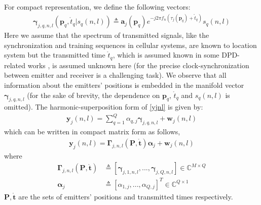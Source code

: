 \documentclass[review]{elsarticle}
\begin{document}
For compact representation, we define the following vectors:
\begin{align}\label{gamma}
    \boldsymbol{\gamma}_{j,q,n,l}(\boldsymbol{p}_q,\mathring{t}_q\vert s_q(n,l))\triangleq\boldsymbol{a}_j(\boldsymbol{p}_q)e^{-j2\pi f_n(\tau_j(\boldsymbol{p}_q)+\mathring{t}_q)}s_q(n,l)
\end{align}
Here we assume that the spectrum of transmitted signals, like the synchronization and training sequences in cellular systems, are known to location system but the transmitted time $\mathring{t}_q$, which is assumed known in some DPD-related works \cite{DPD2005,2006Efficient}, is assumed unknown here (for the precise clock-synchronization between emitter and receiver is a challenging task). We observe that all information about the emitters' positions is embedded in the manifold vector $\boldsymbol{\gamma}_{j,q,n,l}$ (for the sake of brevity, the dependence on $\boldsymbol{p}_q$, $\mathring{t}_q$ and $s_q(n,l)$ is omitted). The harmonic-superposition form of \eqref{yjnl} is given by:
\begin{align}\label{yjnl2}
    \boldsymbol{y}_j(n,l)=\sum_{q=1}^Q\alpha_{q,j}\boldsymbol{\gamma}_{j,q,n,l}+\boldsymbol{w}_j(n,l)
\end{align}
which can be written in compact matrix form as follows,
\begin{align}
    \boldsymbol{y}_j(n,l)=\boldsymbol{\Gamma}_{j,n,l}(\boldsymbol{P},\mathring{\boldsymbol{t}})\boldsymbol{\alpha}_j+\boldsymbol{w}_j(n,l)
\end{align}
where  
\begin{align}\label{Gammajnl}
    \boldsymbol{\Gamma}_{j,n,l}(\boldsymbol{P},\mathring{\boldsymbol{t}})&\triangleq[\boldsymbol{\gamma}_{j,1,n,l},...,\boldsymbol{\gamma}_{j,Q,n,l}]\in \mathbb{C}^{M\times Q}\\ \nonumber
    \boldsymbol{\alpha}_j&\triangleq[\alpha_{1,j},...,\alpha_{Q,j}]^T\in \mathbb{C}^{Q\times 1} 
\end{align}
$\boldsymbol{P},\mathring{\boldsymbol{t}}$ are the sets of emitters' positions and transmitted times respectively.
\end{document}
